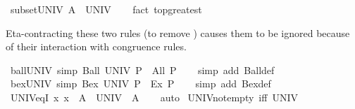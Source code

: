 \begin{isabellebody}
\isanewline
{}\isamarkupfalse%
\ subset{\isacharunderscore}{\kern0pt}UNIV{\isacharcolon}{\kern0pt}\ {\isachardoublequoteopen}A\ {\isasymsubseteq}\ UNIV{\isachardoublequoteclose}\isanewline
%
\isadelimproof
\ \ %
\endisadelimproof
%
\isatagproof
{}\isamarkupfalse%
\ {\isacharparenleft}{\kern0pt}fact\ top{\isacharunderscore}{\kern0pt}greatest{\isacharparenright}{\kern0pt}%
\endisatagproof
{\isafoldproof}%
%
\isadelimproof
%
\endisadelimproof
%
\begin{isamarkuptext}%
\medskip
  Eta-contracting these two rules (to remove ) causes them
  to be ignored because of their interaction with congruence rules.%
\end{isamarkuptext}\isamarkuptrue%
\isamarkupfalse%
\ ball{\isacharunderscore}{\kern0pt}UNIV\ {\isacharbrackleft}{\kern0pt}simp{\isacharbrackright}{\kern0pt}{\isacharcolon}{\kern0pt}\ {\isachardoublequoteopen}Ball\ UNIV\ P\ {\isasymlongleftrightarrow}\ All\ P{\isachardoublequoteclose}\isanewline
%
\isadelimproof
\ \ %
\endisadelimproof
%
\isatagproof
{}\isamarkupfalse%
\ {\isacharparenleft}{\kern0pt}simp\ add{\isacharcolon}{\kern0pt}\ Ball{\isacharunderscore}{\kern0pt}def{\isacharparenright}{\kern0pt}%
\endisatagproof
{\isafoldproof}%
%
\isadelimproof
\isanewline
%
\endisadelimproof
\isanewline
{}\isamarkupfalse%
\ bex{\isacharunderscore}{\kern0pt}UNIV\ {\isacharbrackleft}{\kern0pt}simp{\isacharbrackright}{\kern0pt}{\isacharcolon}{\kern0pt}\ {\isachardoublequoteopen}Bex\ UNIV\ P\ {\isasymlongleftrightarrow}\ Ex\ P{\isachardoublequoteclose}\isanewline
%
\isadelimproof
\ \ %
\endisadelimproof
%
\isatagproof
{}\isamarkupfalse%
\ {\isacharparenleft}{\kern0pt}simp\ add{\isacharcolon}{\kern0pt}\ Bex{\isacharunderscore}{\kern0pt}def{\isacharparenright}{\kern0pt}%
\endisatagproof
{\isafoldproof}%
%
\isadelimproof
\isanewline
%
\endisadelimproof
\isanewline
{}\isamarkupfalse%
\ UNIV{\isacharunderscore}{\kern0pt}eq{\isacharunderscore}{\kern0pt}I{\isacharcolon}{\kern0pt}\ {\isachardoublequoteopen}{\isacharparenleft}{\kern0pt}{\isasymAnd}x{\isachardot}{\kern0pt}\ x\ {\isasymin}\ A{\isacharparenright}{\kern0pt}\ {\isasymLongrightarrow}\ UNIV\ {\isacharequal}{\kern0pt}\ A{\isachardoublequoteclose}\isanewline
%
\isadelimproof
\ \ %
\endisadelimproof
%
\isatagproof
{}\isamarkupfalse%
\ auto%
\endisatagproof
{\isafoldproof}%
%
\isadelimproof
\isanewline
%
\endisadelimproof
\isanewline
{}\isamarkupfalse%
\ UNIV{\isacharunderscore}{\kern0pt}not{\isacharunderscore}{\kern0pt}empty\ {\isacharbrackleft}{\kern0pt}iff{\isacharbrackright}{\kern0pt}{\isacharcolon}{\kern0pt}\ {\isachardoublequoteopen}UNIV\ {\isasymnoteq}\ {\isacharbraceleft}{\kern0pt}{\isacharbraceright}{\kern0pt}{\isachardoublequoteclose}\isanewline

\end{isabellebody}
